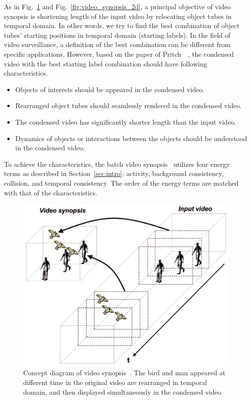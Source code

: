 \documentclass[11pt]{hyu_thesis}
\begin{document}
As in Fig.~\ref{fig:video_synopsis} and Fig.~\ref{fig:video_synopsis_2d}, a principal objective of video synopsis is shortening length of the input video by relocating object tubes in temporal domain. In other words, we try to find the best combination of object tubes' starting positions in temporal domain (starting labels). In the field of video surveillance, a definition of the best combination can be different from specific applications. However, based on the paper of Pritch~\etal~\cite{Pritch2008}, the condensed video with the best starting label combination should have following characteristics.
\begin{itemize}
\item Objects of interests should be appeared in the condensed video.
\item Rearranged object tubes should seamlessly rendered in the condensed video.
\item The condensed video has significantly shorter length than the input video.
\item Dynamics of objects or interactions between the objects should be understood in the condensed video.
\end{itemize}
To achieve the characteristics, the batch video synopsis~\cite{Pritch2008} utilizes four energy terms as described in Section~\ref{sec:intro}: activity, background consistency, collision, and temporal consistency. The order of the energy terms are matched with that of the characteristics.

\begin{figure}
	\begin{center}
		\includegraphics[width=\linewidth]{video_synopsis.eps}
	\end{center}
	\caption{Concept diagram of video synopsis~\cite{Pritch2009}. The bird and man appeared at different time in the original video are rearranged in temporal domain, and then displayed simultaneously in the condensed video.}
	\label{fig:video_synopsis}
\end{figure}
\end{document}
